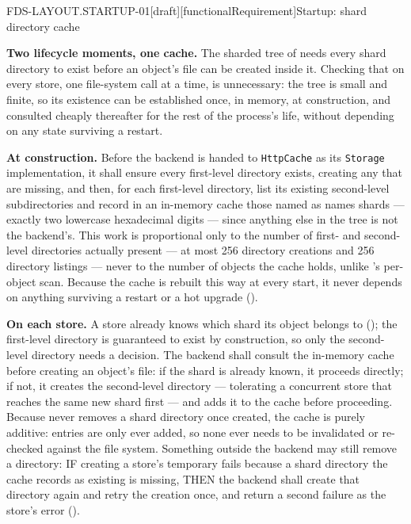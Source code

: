 \begin{requirement}{FDS-LAYOUT.STARTUP-01}[draft][functionalRequirement]{Startup: shard directory cache}


  \textbf{Two lifecycle moments, one cache.} The sharded tree of
   needs every shard directory to exist
  before an object's file can be created inside it. Checking that on every
  store, one file-system call at a time, is unnecessary: the tree is small
  and finite, so its existence can be established once, in memory, at
  construction, and consulted cheaply thereafter for the rest of the
  process's life, without depending on any state surviving a restart.

  \textbf{At construction.} Before the backend is handed to
  \texttt{HttpCache} as its \texttt{Storage} implementation, it shall
  ensure every first-level directory exists, creating any that are
  missing, and then, for each first-level directory, list its existing
  second-level subdirectories and record in an in-memory cache those named
  as  names shards --- exactly two lowercase
  hexadecimal digits --- since anything else in the tree is not the
  backend's. This
  work is proportional only to the number of first- and second-level
  directories actually present --- at most 256 directory creations and 256
  directory listings --- never to the number of objects the cache holds,
  unlike 's per-object scan. Because the
  cache is rebuilt this way at every start, it never depends on anything
  surviving a restart or a hot upgrade ().

  \textbf{On each store.} A store already knows which shard its object
  belongs to (); the first-level directory
  is guaranteed to exist by construction, so only the second-level
  directory needs a decision. The backend shall consult the in-memory
  cache before creating an object's file: if the shard is already known,
  it proceeds directly; if not, it creates the second-level directory ---
  tolerating a concurrent store that reaches the same new shard first ---
  and adds it to the cache before proceeding. Because
   never removes a shard directory once
  created, the cache is purely additive: entries are only ever added, so
  none ever needs to be invalidated or re-checked against the file system.
  Something outside the backend may still remove a directory: IF creating a
  store's temporary fails because a shard directory the cache records as
  existing is missing, THEN the backend shall create that directory again
  and retry the creation once, and return a second failure as the store's
  error ().


\end{requirement}

